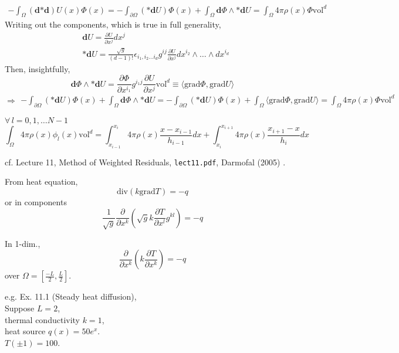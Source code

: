\documentclass[10pt]{amsart}
\begin{document}
\begin{multicols*}{2}
\[
\begin{gathered}
  -\int_{\Omega} (\mathbf{d}\mathbf{*}\mathbf{d})U(x)\Phi(x) = -\int_{\partial \Omega} (\mathbf{*} \mathbf{d}U) \Phi(x) + \int_{\Omega} \mathbf{d}\Phi \wedge \mathbf{*}\mathbf{d}U = \int_{\Omega} 4\pi \rho(x)\Phi\text{vol}^d
\end{gathered}
\]
Writing out the components, which is true in full generality,
\[
\begin{aligned}
  & \mathbf{d}U = \frac{ \partial U}{ \partial x^j} dx^j \\ 
  & \mathbf{*}\mathbf{d}U = \frac{ \sqrt{g}}{ (d-1)!} \epsilon_{i_1 , i_2 \dots i_d} g^{ij} \frac{ \partial U}{ \partial x^j} dx^{i_2} \wedge \dots \wedge dx^{i_d} 
  \end{aligned}
\]
Then, insightfully,
\[
\mathbf{d}\Phi \wedge \mathbf{*} \mathbf{d}U = \frac{ \partial \Phi }{ \partial x^{i_1} } g^{i_1 j} \frac{ \partial U}{ \partial x^j} \text{vol}^d \equiv \langle \text{grad} \Phi, \text{grad} U \rangle
\]
\begin{equation}
  \Longrightarrow
  \begin{gathered}
-\int_{\partial \Omega} (\mathbf{*}\mathbf{d}U ) \Phi(x) + \int_{\Omega} \mathbf{d}\Phi \wedge \mathbf{*}\mathbf{d}U = - \int_{\partial \Omega} (\mathbf{*}\mathbf{d}U ) \Phi(x) + \int_{\Omega} \langle \text{grad}\Phi, \text{grad}U \rangle = \int_{\Omega} 4\pi \rho(x) \Phi \text{vol}^d
    \end{gathered}
  \end{equation}


$\forall \, l = 0,1, \dots N-1$
\[
\int_{\Omega} 4\pi \rho(x) \phi_l(x) \text{vol}^d = \int_{x_{i-1}}^{ x_i} 4\pi \rho(x) \frac{ x- x_{i-1} }{h_{i-1} } dx + \int_{x_i}^{ x_{i+1}} 4\pi \rho(x) \frac{ x_{i+1} - x}{h_i} dx
\]

cf. Lecture 11, Method of Weighted Residuals, \verb|lect11.pdf|, Darmofal (2005) \cite{Darm2005}.

From heat equation,
\begin{equation}
  \text{div}(k\text{grad}T) = -q 
  \end{equation}
or in components
\[
\frac{1}{\sqrt{g}} \frac{ \partial }{ \partial x^k} \left(\sqrt{g} k \frac{ \partial T}{ \partial x^l} g^{kl} \right) = -q
\]

In 1-dim.,
\[
\frac{ \partial }{ \partial x^k} \left( k \frac{ \partial T}{ \partial x^k} \right) = -q
\]
over $\Omega = \left[ \frac{-L}{2}, \frac{L}{2} \right]$.  

e.g. Ex. 11.1 (Steady heat diffusion), \\
Suppose $L=2$, \\
thermal conductivity $k=1$, \\
heat source $q(x) = 50e^x$.  \\
$T(\pm 1) = 100$.


\end{multicols*}
\end{document}
